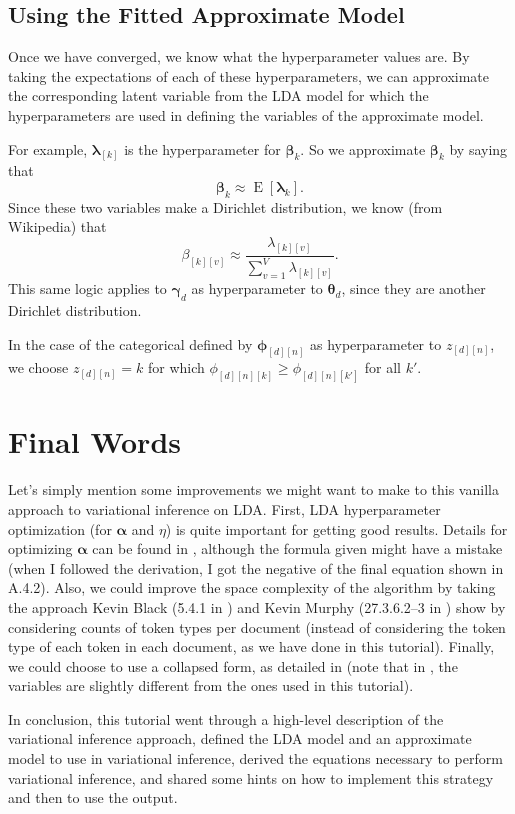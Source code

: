 \documentclass[12pt]{article}
\newcommand{\E}{\operatorname{E}}
\begin{document}
\subsection{Using the Fitted Approximate Model}

Once we have converged, we know what the hyperparameter values are.  By taking
the expectations of each of these hyperparameters, we can approximate the
corresponding latent variable from the LDA model for which the hyperparameters
are used in defining the variables of the approximate model.

For example, $\bm{\lambda}_{[k]}$ is the hyperparameter for $\bm{\beta}_{k}$.
So we approximate $\bm{\beta}_{k}$ by saying that
\begin{equation}
    \bm{\beta}_{k} \approx \E[\bm{\lambda}_{k}].
\end{equation}
Since these two variables make a Dirichlet distribution, we know (from
Wikipedia) that
\begin{equation}
    \beta_{[k][v]} \approx \frac{\lambda_{[k][v]}}{\sum_{v=1}^{V}
    \lambda_{[k][v]}}.
\end{equation}
This same logic applies to $\bm{\gamma}_{d}$ as hyperparameter to
$\bm{\theta}_{d}$, since they are another Dirichlet distribution.

In the case of the categorical defined by $\bm{\phi}_{[d][n]}$ as hyperparameter
to $z_{[d][n]}$, we choose $z_{[d][n]} = k$ for which $\phi_{[d][n][k]} \geq
\phi_{[d][n][k']}$ for all $k'$.  \section{Final Words}

Let's simply mention some improvements we might want to make to this vanilla
approach to variational inference on LDA.  First, LDA hyperparameter
optimization (for $\bm{\alpha}$ and $\eta$) is quite important for getting good
results.  Details for optimizing $\bm{\alpha}$ can be found in
\autocite{Blei:2003:LDA}, although the formula given might have a mistake (when
I followed the derivation, I got the negative of the final equation shown in
A.4.2).  Also, we could improve the space complexity of the algorithm by taking
the approach Kevin Black (5.4.1 in \autocite{kb}) and Kevin Murphy (27.3.6.2--3
in \autocite{Murphy}) show by considering counts of token types per document
(instead of considering the token type of each token in each document, as we
have done in this tutorial).  Finally, we could choose to use a collapsed form,
as detailed in \autocite{collapsedvariational} (note that in
\autocite{collapsedvariational}, the variables are slightly different from the
ones used in this tutorial).

In conclusion, this tutorial went through a high-level description of the
variational inference approach, defined the LDA model and an approximate model
to use in variational inference, derived the equations necessary to perform
variational inference, and shared some hints on how to implement this strategy
and then to use the output.

\printbibliography
\end{document}
